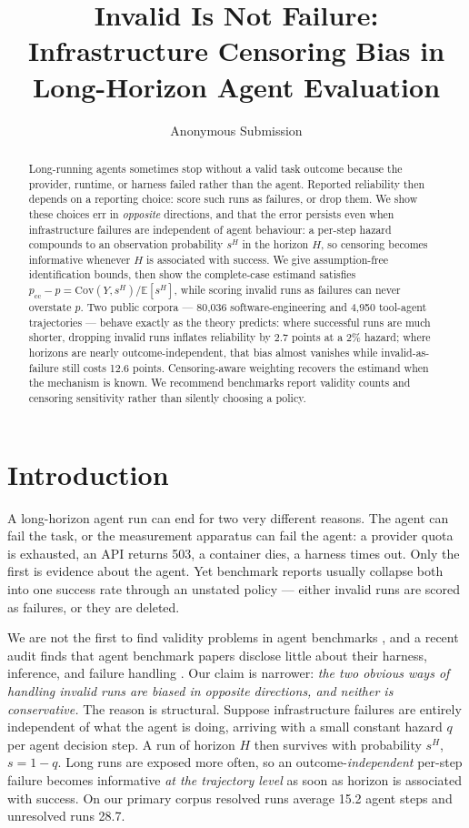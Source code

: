 \documentclass[letterpaper]{article}
\title{Invalid Is Not Failure:\\
Infrastructure Censoring Bias in Long-Horizon Agent Evaluation}
\author{Anonymous Submission}
\begin{document}
\maketitle

\begin{abstract}
Long-running agents sometimes stop without a valid task outcome because the
provider, runtime, or harness failed rather than the agent. Reported reliability
then depends on a reporting choice: score such runs as failures, or drop them.
We show these choices err in \emph{opposite} directions, and that the error
persists even when infrastructure failures are independent of agent behaviour: a
per-step hazard compounds to an observation probability $s^{H}$ in the horizon
$H$, so censoring becomes informative whenever $H$ is associated with success.
We give assumption-free identification bounds, then show the complete-case
estimand satisfies $p_{\mathrm{cc}}-p=\mathrm{Cov}(Y,s^{H})/\mathbb{E}[s^{H}]$,
while scoring invalid runs as failures can never overstate $p$. Two public
corpora --- 80{,}036 software-engineering and 4{,}950 tool-agent trajectories
--- behave exactly as the theory predicts: where successful runs are much
shorter, dropping invalid runs inflates reliability by 2.7 points at a 2\%
hazard; where horizons are nearly outcome-independent, that bias almost
vanishes while invalid-as-failure still costs 12.6 points. Censoring-aware
weighting recovers the estimand when the mechanism is known. We recommend
benchmarks report validity counts and censoring sensitivity rather than silently
choosing a policy.
\end{abstract}

\section{Introduction}

A long-horizon agent run can end for two very different reasons. The agent can
fail the task, or the measurement apparatus can fail the agent: a provider quota
is exhausted, an API returns 503, a container dies, a harness times out. Only
the first is evidence about the agent. Yet benchmark reports usually collapse
both into one success rate through an unstated policy --- either invalid runs
are scored as failures, or they are deleted.

We are not the first to find validity problems in agent benchmarks
\citep{kapoor2024agentsthatmatter,weidinger2025evalscience,zhu2026guardrails},
and a recent audit finds that agent benchmark papers disclose little about their
harness, inference, and failure handling \citep{moghadasi2026disclose}. Our
claim is narrower: \emph{the two obvious ways of handling invalid runs are
biased in opposite directions, and neither is conservative.} The reason is
structural. Suppose infrastructure failures are entirely independent of what the
agent is doing, arriving with a small constant hazard $q$ per agent decision
step. A run of horizon $H$ then survives with probability $s^{H}$, $s=1-q$.
Long runs are exposed more often, so an outcome-\emph{independent} per-step
failure becomes informative \emph{at the trajectory level} as soon as horizon is
associated with success. On our primary corpus resolved runs average 15.2 agent
steps and unresolved runs 28.7.
\end{document}
